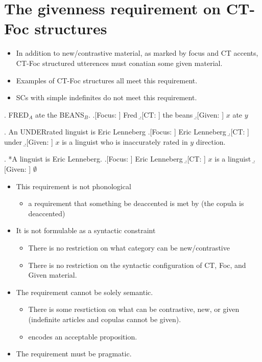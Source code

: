 \documentclass[GPFinal]{subfiles}
\begin{document}
\section{The givenness requirement on CT-Foc structures}
\begin{itemize}
  \item In addition to new/contrastive material, as marked by focus and CT accents, CT-Foc structured utterences must conatian some given material.
  \item Examples of CT-Foc structures all meet this requirement.
  \item SCs with simple indefinites do not meet this requirement.
\end{itemize}
\ex. FRED$_A$ ate the BEANS$_B$.
\a.[Focus: ] Fred
\b.[CT: ] the beans
\b.[Given: ] $x$ ate $y$

\ex. An UNDERrated linguist is Eric Lenneberg
\a.[Focus: ] Eric Lenneberg
\b.[CT: ] under
\b.[Given: ] $x$ is a linguist who is inaccurately rated in $y$ direction.

\ex. *A linguist is Eric Lenneberg.
\a.[Focus: ] Eric Lenneberg
\b.[CT: ] $x$ is a linguist
\b.[Given: ] $\emptyset$

\begin{itemize}
  \item This requirement is not phonological
    \begin{itemize}
      \item a requirement that something be deaccented is met by \Last (the copula is deaccented)
    \end{itemize}
  \item It is not formulable as a syntactic constraint
    \begin{itemize}
      \item There is no restriction on what category can be new/contrastive
      \item There is no restriction on the syntactic configuration of CT, Foc, and Given material.
    \end{itemize}
  \item The requirement cannot be solely semantic.
    \begin{itemize}
      \item There is some resrtiction on what can be contrastive, new, or given (indefinite articles and copulas cannot be given).
      \item \Last encodes an acceptable proposition.
    \end{itemize}
  \item The requirement must be pragmatic.
\end{itemize}
\end{document}
